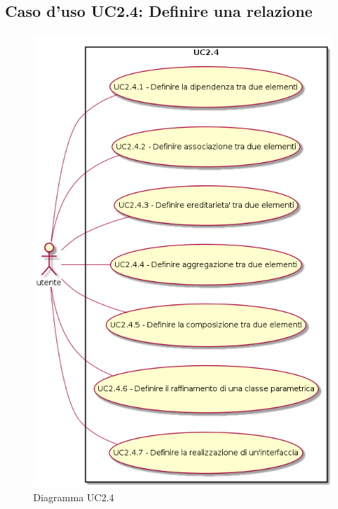 \documentclass[../AnalisiDeiRequisiti.tex]{subfiles}
\begin{document}
	\subsection{Caso d'uso UC2.4: Definire una relazione}
	\begin{figure} [H]
		\centering
		\includegraphics[scale=0.45]{./Figures/UC2_4.png}
		\caption{Diagramma UC2.4}\label{}
	\end{figure}
\end{document}
